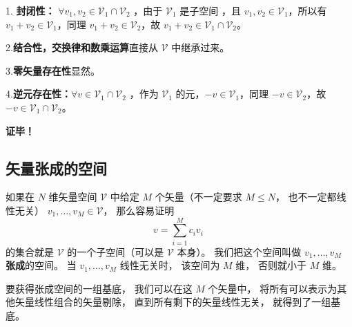 1. \textbf{封闭性：} $\forall v_1,v_2\in\mathcal V_1\cap\mathcal V_2$ ，由于 $\mathcal V_1$ 是子空间 ，且 $v_1,v_2\in\mathcal V_1$，所以有 $v_1+v_2\in \mathcal V_1$，同理 $v_1+v_2\in \mathcal V_2$，故 $v_1+v_2\in \mathcal V_1\cap\mathcal V_2$。

2.\textbf{结合性，交换律和数乘运算}直接从 $\mathcal V$ 中继承过来。

3.\textbf{零矢量存在性}显然。

4.\textbf{逆元存在性：}$\forall v\in\mathcal V_1\cap\mathcal V_2$ ，作为 $\mathcal V_1$ 的元，$-v\in \mathcal V_1$，同理 $-v\in\mathcal V_2$，故 $-v\in\mathcal V_1\cap\mathcal V_2$。

\textbf{证毕！}


\subsection{矢量张成的空间}


如果在 $N$ 维矢量空间 $\mathcal V$ 中给定 $M$ 个矢量（不一定要求 $M \leqslant N$， 也不一定都线性无关） ${v_1}, \dots, {v_M} \in \mathcal V$， 那么容易证明
\begin{equation}
{v} = \sum_{i=1}^M c_i {v_i}~
\end{equation}
的集合就是 $\mathcal V$ 的一个子空间（可以是 $\mathcal V$ 本身）。 我们把这个空间叫做 ${v_1}, \dots, {v_M}$ \textbf{张成}的空间。 当 ${v_1}, \dots, {v_M}$ 线性无关时， 该空间为 $M$ 维， 否则就小于 $M$ 维。

要获得张成空间的一组基底， 我们可以在这 $M$ 个矢量中， 将所有可以表示为其他矢量线性组合的矢量剔除， 直到所有剩下的矢量线性无关， 就得到了一组基底。
